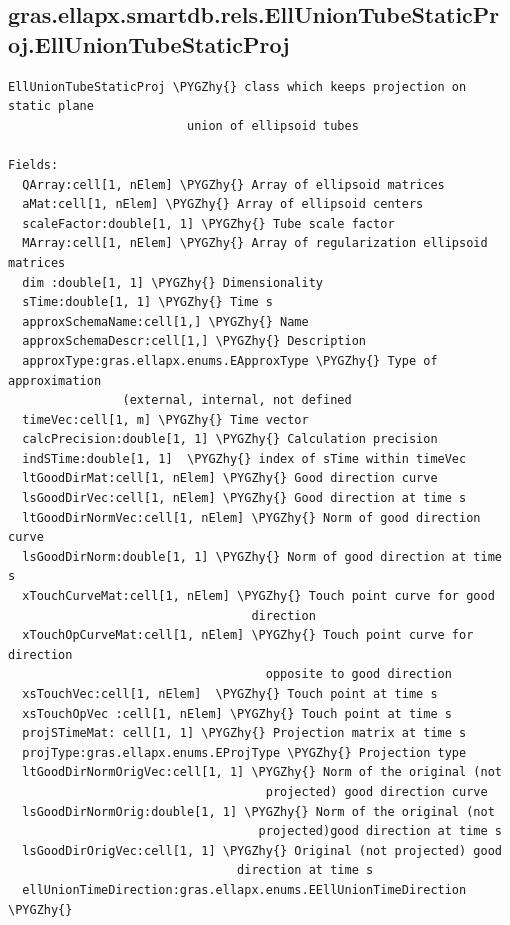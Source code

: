 \documentclass[letterpaper,10pt,english]{sphinxmanual}
\def\PYGZhy{\char`\-}
\begin{document}
\subsection{gras.ellapx.smartdb.rels.EllUnionTubeStaticProj.EllUnionTubeStaticProj}
\label{chap_functions:gras-ellapx-smartdb-rels-elluniontubestaticproj-elluniontubestaticproj}
\begin{Verbatim}[commandchars=\\\{\}]
EllUnionTubeStaticProj \PYGZhy{} class which keeps projection on static plane
                         union of ellipsoid tubes

Fields:
  QArray:cell[1, nElem] \PYGZhy{} Array of ellipsoid matrices
  aMat:cell[1, nElem] \PYGZhy{} Array of ellipsoid centers
  scaleFactor:double[1, 1] \PYGZhy{} Tube scale factor
  MArray:cell[1, nElem] \PYGZhy{} Array of regularization ellipsoid matrices
  dim :double[1, 1] \PYGZhy{} Dimensionality
  sTime:double[1, 1] \PYGZhy{} Time s
  approxSchemaName:cell[1,] \PYGZhy{} Name
  approxSchemaDescr:cell[1,] \PYGZhy{} Description
  approxType:gras.ellapx.enums.EApproxType \PYGZhy{} Type of approximation
                (external, internal, not defined
  timeVec:cell[1, m] \PYGZhy{} Time vector
  calcPrecision:double[1, 1] \PYGZhy{} Calculation precision
  indSTime:double[1, 1]  \PYGZhy{} index of sTime within timeVec
  ltGoodDirMat:cell[1, nElem] \PYGZhy{} Good direction curve
  lsGoodDirVec:cell[1, nElem] \PYGZhy{} Good direction at time s
  ltGoodDirNormVec:cell[1, nElem] \PYGZhy{} Norm of good direction curve
  lsGoodDirNorm:double[1, 1] \PYGZhy{} Norm of good direction at time s
  xTouchCurveMat:cell[1, nElem] \PYGZhy{} Touch point curve for good
                                  direction
  xTouchOpCurveMat:cell[1, nElem] \PYGZhy{} Touch point curve for direction
                                    opposite to good direction
  xsTouchVec:cell[1, nElem]  \PYGZhy{} Touch point at time s
  xsTouchOpVec :cell[1, nElem] \PYGZhy{} Touch point at time s
  projSTimeMat: cell[1, 1] \PYGZhy{} Projection matrix at time s
  projType:gras.ellapx.enums.EProjType \PYGZhy{} Projection type
  ltGoodDirNormOrigVec:cell[1, 1] \PYGZhy{} Norm of the original (not
                                    projected) good direction curve
  lsGoodDirNormOrig:double[1, 1] \PYGZhy{} Norm of the original (not
                                   projected)good direction at time s
  lsGoodDirOrigVec:cell[1, 1] \PYGZhy{} Original (not projected) good
                                direction at time s
  ellUnionTimeDirection:gras.ellapx.enums.EEllUnionTimeDirection \PYGZhy{}

\end{Verbatim}
\end{document}
